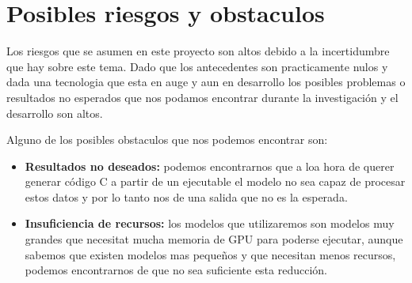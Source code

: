 \section{Posibles riesgos y obstaculos}
\label{sec:riesgos}

Los riesgos que se asumen en este proyecto son altos debido a la incertidumbre que hay sobre este tema. Dado que los antecedentes son practicamente nulos y dada una tecnologia
que esta en auge y aun en desarrollo los posibles problemas o resultados no esperados que nos podamos encontrar durante la investigación y el desarrollo son altos.

Alguno de los posibles obstaculos que nos podemos encontrar son:

\begin{itemize}
    \item \textbf{Resultados no deseados:} podemos encontrarnos que a loa hora de querer generar código C a partir de un ejecutable el modelo no sea capaz de procesar estos datos y por lo tanto nos de una salida que no es la esperada.
    \item \textbf{Insuficiencia de recursos:} los modelos que utilizaremos son modelos muy grandes que necesitat mucha memoria de GPU para poderse ejecutar, aunque sabemos que existen modelos mas pequeños y que necesitan menos recursos, podemos encontrarnos de que no sea suficiente esta reducción.
\end{itemize}